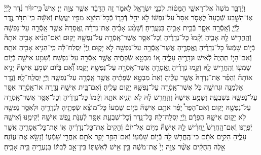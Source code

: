 \documentclass[twoside, openany, parskip=half, 11pt]{book}
\begin{document}
\begin{footnotesize}
\begin{multicols}{2}
\\
וַיְֿדַבֵּ֤ר מֹשֶׁה֙ אֶל־רָאשֵׁ֣י הַמַּטּ֔וֹת לִבְנֵ֥י יִשְׂרָאֵ֖ל לֵאמֹ֑ר זֶ֣ה הַדָּבָ֔ר אֲשֶׁ֖ר צִוָּ֥ה יְיָ׃ אִישׁ֩ כִּֽי־יִדֹּ֨ר נֶ֜דֶר לַֽיְֿיָ֗ אֽוֹ־הִשָּׁ֤בַע שְֿׁבֻעָה֙ לֶאְסֹ֤ר אִסָּר֙ עַל־נַפְשׁ֔וֹ לֹ֥א יַחֵ֖ל דְּֿבָר֑וֹ כְּֿכׇל־הַיֹּצֵ֥א מִפִּ֖יו יַֽעֲשֶֽׂה׃ וְֿאִשָּׁ֕ה כִּֽי־תִדֹּ֥ר נֶ֖דֶר לַֽיְֿיָ֑ וְֿאָֽסְֿרָ֥ה אִסָּ֛ר בְּֿבֵ֥ית אָבִ֖יהָ בִּנְעֻרֶֽיהָ׃ וְֿשָׁמַ֨ע אָבִ֜יהָ אֶת־נִדְרָ֗הּ וֶֽאֱסָרָהּ֙ אֲשֶׁ֣ר אָֽסְֿרָ֣ה עַל־נַפְשָׁ֔הּ וְֿהֶֽחֱרִ֥ישׁ לָ֖הּ אָבִ֑יהָ וְֿקָ֨מוּ֙ כׇּל־נְדָרֶ֔יהָ וְֿכׇל־אִסָּ֛ר אֲשֶׁר־אָֽסְֿרָ֥ה עַל־נַפְשָׁ֖הּ יָקֽוּם׃ וְֿאִם־הֵנִ֨יא אָבִ֣יהָ אֹתָהּ֘ בְּֿי֣וֹם שָׁמְֿעוֹ֒ כׇּל־נְדָרֶ֗יהָ וֶֽאֱסָרֶ֛יהָ אֲשֶׁר־אָֽסְֿרָ֥ה עַל־נַפְשָׁ֖הּ לֹ֣א יָק֑וּם וַֽיְֿיָ֙ יִֽסְלַח־לָ֔הּ כִּֽי־הֵנִ֥יא אָבִ֖יהָ אֹתָֽהּ׃ וְֿאִם־הָי֤וֹ תִֽהְיֶה֙ לְֿאִ֔ישׁ וּנְדָרֶ֖יהָ עָלֶ֑יהָ א֚וֹ מִבְטָ֣א שְֿׂפָתֶ֔יהָ אֲשֶׁ֥ר אָֽסְֿרָ֖ה עַל־נַפְשָֽׁהּ׃ וְֿשָׁמַ֥ע אִישָׁ֛הּ בְּֿי֥וֹם שָׁמְֿע֖וֹ וְֿהֶֽחֱרִ֣ישׁ לָ֑הּ וְֿקָ֣מוּ נְֿדָרֶ֗יהָ וֶֽאֱסָרֶ֛הָ אֲשֶׁר־אָֽסְֿרָ֥ה עַל־נַפְשָׁ֖הּ יָקֻֽמוּ׃ וְֿ֠אִ֠ם בְּֿי֨וֹם שְֿׁמֹ֣עַֽ אִישָׁהּ֘ יָנִ֣יא אוֹתָהּ֒ וְֿהֵפֵ֗ר אֶת־נִדְרָהּ֙ אֲשֶׁ֣ר עָלֶ֔יהָ וְֿאֵת֙ מִבְטָ֣א שְֿׂפָתֶ֔יהָ אֲשֶׁ֥ר אָֽסְֿרָ֖ה עַל־נַפְשָׁ֑הּ וַֽיְֿיָ֖ יִֽסְלַֽח־לָֽהּ׃  וְֿנֵ֥דֶר אַלְמָנָ֖ה וּגְרוּשָׁ֑ה כֹּ֛ל אֲשֶׁר־אָֽסְֿרָ֥ה עַל־נַפְשָׁ֖הּ יָק֥וּם עָלֶֽיהָ׃ וְֿאִם־בֵּ֥ית אִישָׁ֖הּ נָדָ֑רָה אוֹ־אָֽסְֿרָ֥ה אִסָּ֛ר עַל־נַפְשָׁ֖הּ בִּשְׁבֻעָֽה׃ וְֿשָׁמַ֤ע אִישָׁהּ֙ וְֿהֶֽחֱרִ֣שׁ לָ֔הּ לֹ֥א הֵנִ֖יא אֹתָ֑הּ וְֿקָ֨מוּ֙ כׇּל־נְדָרֶ֔יהָ וְֿכׇל־אִסָּ֛ר אֲשֶׁר־אָֽסְֿרָ֥ה עַל־נַפְשָׁ֖הּ יָקֽוּם׃ וְֿאִם־הָפֵר֩ יָפֵ֨ר אֹתָ֥ם אִישָׁהּ֘ בְּֿי֣וֹם שָׁמְֿעוֹ֒ כׇּל־מוֹצָ֨א שְֿׂפָתֶ֧יהָ לִנְדָרֶ֛יהָ וּלְאִסַּ֥ר נַפְשָׁ֖הּ לֹ֣א יָק֑וּם אִישָׁ֣הּ הֲפֵרָ֔ם וַֽיְֿיָ֖ יִֽסְלַֽח־לָֽהּ׃  כׇּל־נֵ֛דֶר וְֿכׇל־שְׁבֻעַ֥ת אִסָּ֖ר לְֿעַנֹּ֣ת נָ֑פֶשׁ אִישָׁ֥הּ יְֿקִימֶ֖נּוּ וְֿאִישָׁ֥הּ יְֿפֵרֶֽנּוּ׃ וְֿאִם־הַֽחֲרֵשׁ֩ יַֽחֲרִ֨ישׁ לָ֥הּ אִישָׁהּ֘ מִיּ֣וֹם אֶל־יוֹם֒ וְֿהֵקִים֙ אֶת־כׇּל־נְדָרֶ֔יהָ א֥וֹ אֶת־כׇּל־אֱסָרֶ֖יהָ אֲשֶׁ֣ר עָלֶ֑יהָ הֵקִ֣ים אֹתָ֔ם כִּי־הֶֽחֱרִ֥שׁ לָ֖הּ בְּֿי֥וֹם שָׁמְֿעֽוֹ׃ וְֿאִם־הָפֵ֥ר יָפֵ֛ר אֹתָ֖ם אַֽחֲרֵ֣י שָׁמְֿע֑וֹ וְֿנָשָׂ֖א אֶת־עֲוֹנָֽהּ׃ אֵ֣לֶּה הַֽחֻקִּ֗ים אֲשֶׁ֨ר צִוָּ֤ה יְיָ֙ אֶת־מֹשֶׁ֔ה בֵּ֥ין אִ֖ישׁ לְֿאִשְׁתּ֑וֹ בֵּין־אָ֣ב לְֿבִתּ֔וֹ בִּנְעֻרֶ֖יהָ בֵּ֥ית אָבִֽיהָ׃


\end{multicols}
\end{footnotesize}
\end{document}
